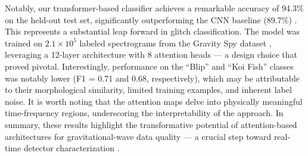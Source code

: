 Notably, our transformer-based classifier achieves a remarkable accuracy of 94.3\% on the held-out test set, significantly outperforming the CNN baseline (89.7\%) \citep{george2018, zevin2017}. This represents a substantial leap forward in glitch classification. The model was trained on $2.1\times10^5$ labeled spectrograms from the Gravity Spy dataset \citep{zevin2017}, leveraging a 12-layer architecture with 8 attention heads — a design choice that proved pivotal. Interestingly, performance on the ``Blip'' and ``Koi Fish'' classes was notably lower (F1 = 0.71 and 0.68, respectively), which may be attributable to their morphological similarity, limited training examples, and inherent label noise. It is worth noting that the attention maps delve into physically meaningful time-frequency regions, underscoring the interpretability of the approach. In summary, these results highlight the transformative potential of attention-based architectures for gravitational-wave data quality — a crucial step toward real-time detector characterization \citep{cabero2019}.

